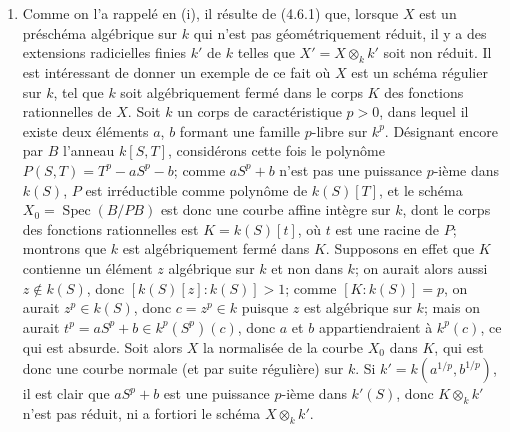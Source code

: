 \begin{remarks}[6.7.5]
\begin{enumerate}

\item[(ii)] Comme on l'a rappelé en (i), il résulte de (4.6.1) que,
lorsque $X$ est un préschéma algébrique sur $k$ qui n'est pas
géométriquement réduit, il y a des extensions radicielles finies $k'$ de
$k$ telles que $X'=X\otimes_k k'$ soit non réduit. Il est intéressant de
donner un exemple de ce fait où $X$ est un schéma régulier sur $k$, tel
que $k$ soit algébriquement fermé dans le corps $K$ des fonctions
rationnelles de $X$. Soit $k$ un corps de caractéristique $p>0$, dans
lequel il existe deux éléments $a$, $b$ formant une famille $p$-libre sur
$k^p$. Désignant encore par $B$ l'anneau $k[S,T]$, considérons cette fois
le polynôme $P(S,T)=T^p-aS^p-b$; comme $aS^p+b$ n'est pas une puissance
$p$-ième dans $k(S)$, $P$ est irréductible comme polynôme de $k(S)[T]$,
et le schéma $X_0=\operatorname{Spec}(B/PB)$ est donc une courbe affine
intègre sur $k$, dont le corps des fonctions rationnelles est
$K=k(S)[t]$, où $t$ est une racine de $P$; montrons que $k$ est
algébriquement fermé dans $K$. Supposons en effet que $K$ contienne un
élément $z$ algébrique sur $k$ et non dans $k$; on aurait alors aussi
$z\notin k(S)$, donc $[k(S)[z]:k(S)]>1$; comme $[K:k(S)]=p$, on aurait
$z^p\in k(S)$, donc $c=z^p\in k$ puisque $z$ est algébrique sur $k$;
mais on aurait $t^p=aS^p+b\in k^p(S^p)(c)$, donc $a$ et $b$
appartiendraient à $k^p(c)$, ce qui est absurde. Soit alors $X$ la
normalisée de la courbe $X_0$ dans $K$, qui est donc une courbe normale
(et par suite régulière) sur $k$. Si $k'=k(a^{1/p},b^{1/p})$, il est
clair que $aS^p+b$ est une puissance $p$-ième dans $k'(S)$, donc
$K\otimes_k k'$ n'est pas réduit, ni a fortiori le schéma
$X\otimes_k k'$.
\end{enumerate}
\end{remarks}

